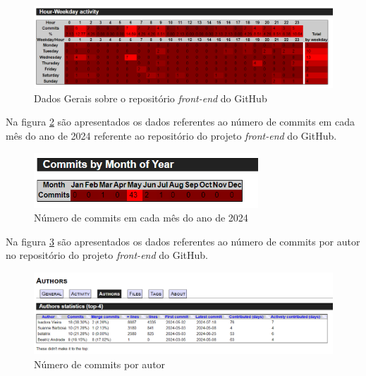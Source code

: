 \begin{figure}[ht]
        \centering
\includegraphics[width=1.0\textwidth]{images/commits-hora-semana-stats-front.png}
        \caption{Dados Gerais sobre o repositório \textit{front-end} do GitHub}
        \label{fig:commitsPorHoraFront}
    \end{figure}

Na figura \ref{fig:commitsPorMesFront} são apresentados os dados referentes ao número de commits em cada mês do ano de 2024 referente ao repositório do projeto \textit{front-end} do GitHub.

\begin{figure}[ht]
        \centering
\includegraphics[width=0.75\textwidth]{images/commits-mes-stats-front.png}
        \caption{Número de commits em cada mês do ano de 2024}
        \label{fig:commitsPorMesFront}
    \end{figure}

Na figura \ref{fig:commitsPorAutorFront} são apresentados os dados referentes ao número de commits por autor no repositório do projeto \textit{front-end} do GitHub.  

\begin{figure}[ht]
        \centering
\includegraphics[width=1.0\textwidth]{images/autor-stats-front.png}
        \caption{Número de commits por autor}
        \label{fig:commitsPorAutorFront}
    \end{figure}

\newpage

